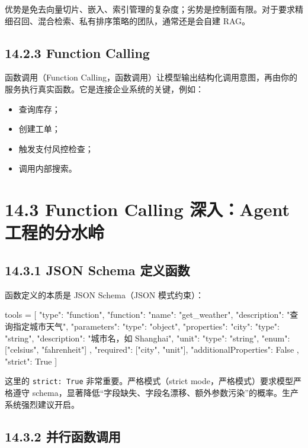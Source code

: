 优势是免去向量切片、嵌入、索引管理的复杂度；劣势是控制面有限。对于要求精细召回、混合检索、私有排序策略的团队，通常还是会自建 RAG。


\subsection{14.2.3 Function Calling}

函数调用（Function Calling，函数调用）让模型输出结构化调用意图，再由你的服务执行真实函数。它是连接企业系统的关键，例如：


\begin{itemize}[leftmargin=2em]
\item 查询库存；
\item 创建工单；
\item 触发支付风控检查；
\item 调用内部搜索。
\end{itemize}

\section{14.3 Function Calling 深入：Agent 工程的分水岭}

\subsection{14.3.1 JSON Schema 定义函数}

函数定义的本质是 JSON Schema（JSON 模式约束）：


\begin{codeblock}
tools = [
    {
        "type": "function",
        "function": {
            "name": "get_weather",
            "description": "查询指定城市天气",
            "parameters": {
                "type": "object",
                "properties": {
                    "city": {"type": "string", "description": "城市名，如 Shanghai"},
                    "unit": {"type": "string", "enum": ["celsius", "fahrenheit"]}
                },
                "required": ["city", "unit"],
                "additionalProperties": False
            },
            "strict": True
        }
    }
]
\end{codeblock}

这里的 \texttt{strict: True} 非常重要。严格模式（strict mode，严格模式）要求模型严格遵守 schema，显著降低``字段缺失、字段名漂移、额外参数污染''的概率。生产系统强烈建议开启。


\subsection{14.3.2 并行函数调用}

